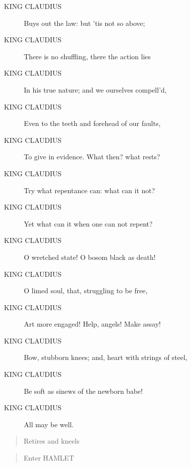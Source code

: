 \documentclass{article}
\begin{document}
\begin{description}
\item[KING CLAUDIUS] Buys out the law: but 'tis not so above;
\item[KING CLAUDIUS] There is no shuffling, there the action lies
\item[KING CLAUDIUS] In his true nature; and we ourselves compell'd,
\item[KING CLAUDIUS] Even to the teeth and forehead of our faults,
\item[KING CLAUDIUS] To give in evidence. What then? what rests?
\item[KING CLAUDIUS] Try what repentance can: what can it not?
\item[KING CLAUDIUS] Yet what can it when one can not repent?
\item[KING CLAUDIUS] O wretched state! O bosom black as death!
\item[KING CLAUDIUS] O limed soul, that, struggling to be free,
\item[KING CLAUDIUS] Art more engaged! Help, angels! Make assay!
\item[KING CLAUDIUS] Bow, stubborn knees; and, heart with strings of steel,
\item[KING CLAUDIUS] Be soft as sinews of the newborn babe!
\item[KING CLAUDIUS] All may be well.
\end{description}
          
\begin{quote}
Retires and kneels
\end{quote}
          
\begin{quote}
Enter HAMLET
\end{quote}
          
\end{document}
